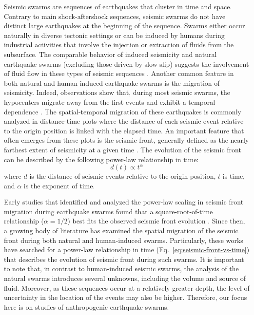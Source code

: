 \documentclass[draft]{agujournal2019}
\begin{document}
Seismic swarms are sequences of earthquakes that cluster in time and space. Contrary to main shock-aftershock sequences, seismic swarms do not have distinct large earthquakes at the beginning of the sequence. Swarms either occur naturally in diverse tectonic settings or can be induced by humans during industrial activities that involve the injection or extraction of fluids from the subsurface. The comparable behavior of induced seismicity and natural earthquake swarms (excluding those driven by slow slip) suggests the involvement of fluid flow in these types of seismic sequences \cite{ChenEtAl2012, DanreEtAl2024a}. Another common feature in both natural and human-induced earthquake swarms is the migration of seismicity. Indeed, observations show that, during most seismic swarms, the hypocenters migrate away from the first events and exhibit a temporal dependence \cite{ShapiroEtAl2002, ChenEtAl2012, DeBarrosEtAl2021, DanreEtAl2024}. The spatial-temporal migration of these earthquakes is commonly analyzed in distance-time plots where the distance of each seismic event relative to the origin position is linked with the elapsed time. An important feature that often emerges from these plots is the seismic front, generally defined as the nearly farthest extent of seismicity at a given time \cite{GoebelBrodsky2018, DanreEtAl2024}. The evolution of the seismic front can be described by the following power-law relationship in time:
\begin{equation}\label{eq:seismic-front-vs-time}
	d(t) \propto t^{\alpha}
\end{equation}
where $d$ is the distance of seismic events relative to the origin position, $t$ is time, and $\alpha$ is the exponent of time.


Early studies that identified and analyzed the power-law scaling in seismic front migration during earthquake swarms found that a square-root-of-time relationship ($\alpha=1/2$) best fits the observed seismic front evolution \cite{ShapiroEtAl1997, ShapiroEtAl2002}. Since then, a growing body of literature has examined the spatial migration of the seismic front during both natural and human-induced swarms. Particularly, these works have searched for a power-law relationship in time (Eq.~\ref{eq:seismic-front-vs-time}) that describes the evolution of seismic front during such swarms. It is important to note that, in contrast to human-induced seismic swarms, the analysis of the natural swarms introduces several unknowns, including the volume and source of fluid.  Moreover, as these sequences occur at a relatively greater depth, the level of uncertainty in the location of the events may also be higher. Therefore, our focus here is on studies of anthropogenic earthquake swarms.
\end{document}
